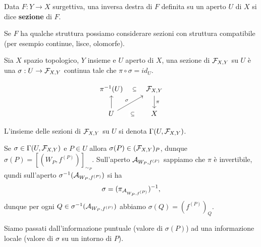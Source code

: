 \begin{definition}[Sezione]
Data $F:Y\to X$ surgettiva, una inversa destra di $F$ definita su un aperto $U$ di $X$ si dice \textbf{sezione} di $F$.
\end{definition}

\begin{remark}
Se $F$ ha qualche struttura possiamo considerare sezioni con struttura compatibile (per esempio continue, lisce, olomorfe).
\end{remark}

\begin{definition}
Sia $X$ spazio topologico, $Y$ insieme e $U$ aperto di $X$, una sezione di $\mathcal{F}_{X,Y}$ su $U$ \`e una $\sigma:U\to \mathcal{F}_{X,Y}$ continua tale che $\pi\circ \sigma=id_U$.

\[\begin{tikzcd}
	{\pi\ii(U)} & {\Fc_{X,Y}} \\
	U & X
	\arrow["\subseteq"{description}, draw=none, from=1-1, to=1-2]
	\arrow["\pi", from=1-2, to=2-2]
	\arrow[from=2-1, to=1-1]
	\arrow["\sigma", from=2-1, to=1-2]
	\arrow["\subseteq"{description}, draw=none, from=2-1, to=2-2]
\end{tikzcd}\]

L'insieme delle sezioni di $\mathcal{F}_{X,Y}$ su $U$ si denota $\Gamma(U,\mathcal{F}_{X,Y})$.
\end{definition}

\begin{remark}
Se $\sigma\in \Gamma(U,\mathcal{F}_{X,Y})$ e $P\in U$ allora $\sigma(P)\in (\mathcal{F}_{X,Y})_P$, dunque $\sigma(P)=[(W_P,f^{(P)})]_{\sim_P}$.
Sull'aperto $\mathcal{A}_{W_P,f^{(P)}}$ sappiamo che $\pi$ \`e invertibile, qundi sull'aperto $\sigma^{-1}(\mathcal{A}_{W_P,f^{(P)}})$ si ha
\[\sigma=(\pi_{\mathcal{A}_{W_P,f^{(P)}}})^{-1},\]
dunque per ogni $Q\in \sigma^{-1}(\mathcal{A}_{W_P,f^{(P)}})$ abbiamo $\sigma(Q)=(f^{(P)})_Q$.
\end{remark}

\begin{center}
Siamo passati dall'informazione puntuale (valore di $\sigma(P)$) ad una informazione locale (valore di $\sigma$ su un intorno di $P$).
\end{center}


